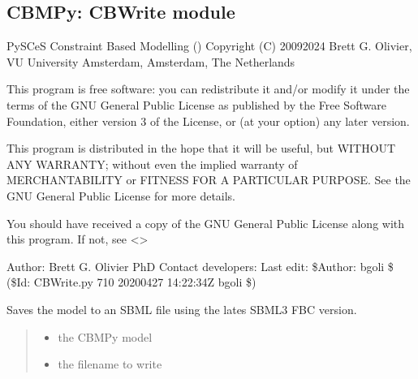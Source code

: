 \documentclass[letterpaper,12pt,english]{sphinxmanual}
\begin{document}
\subsection{CBMPy: CBWrite module}
\label{\detokenize{api/core:cbmpy-cbwrite-module}}
\sphinxAtStartPar
PySCeS Constraint Based Modelling ()
Copyright (C) 2009\sphinxhyphen{}2024 Brett G. Olivier, VU University Amsterdam, Amsterdam, The Netherlands

\sphinxAtStartPar
This program is free software: you can redistribute it and/or modify
it under the terms of the GNU General Public License as published by
the Free Software Foundation, either version 3 of the License, or
(at your option) any later version.

\sphinxAtStartPar
This program is distributed in the hope that it will be useful,
but WITHOUT ANY WARRANTY; without even the implied warranty of
MERCHANTABILITY or FITNESS FOR A PARTICULAR PURPOSE.  See the
GNU General Public License for more details.

\sphinxAtStartPar
You should have received a copy of the GNU General Public License
along with this program.  If not, see \textless{}\textgreater{}

\sphinxAtStartPar
Author: Brett G. Olivier PhD
Contact developers: 
Last edit: \$Author: bgoli \$ (\$Id: CBWrite.py 710 2020\sphinxhyphen{}04\sphinxhyphen{}27 14:22:34Z bgoli \$)


\begin{fulllineitems}

\pysigstartsignatures
\pysiglinewithargsret
{}
{\sphinxparamcomma {}\sphinxparamcomma {}}
{}
\pysigstopsignatures
\sphinxAtStartPar
Saves the model to an SBML file using the lates SBML3 FBC version.
\begin{quote}\begin{description}
\begin{itemize}
\item {} 
\sphinxAtStartPar
{} \textendash{} the CBMPy model

\item {} 
\sphinxAtStartPar
{} \textendash{} the filename to write

\end{itemize}

\end{description}\end{quote}

\end{fulllineitems}
\end{document}

